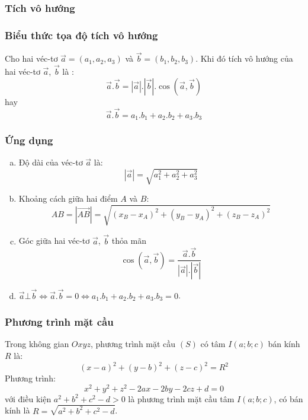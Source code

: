 \subsubsection{Tích vô hướng}
\subsubsection*{Biểu thức tọa độ tích vô hướng}
\begin{dl}
Cho hai véc-tơ $\vec{a}=(a_1,a_2,a_3)$ và $\vec{b}=(b_1,b_2,b_3)$. Khi đó tích vô hướng của hai véc-tơ $\vec{a}$, $\vec{b}$ là :
$$\boxed{\vec{a}.\vec{b}=\left| {\vec{a}}\right|.\left| {\vec{b}}\right|.\cos \left(\vec{a},\vec{b}\right)}$$ hay  $$\boxed{\vec{a}.\vec{b}=a_1.b_1+a_2.b_2+a_3.b_3}$$
\end{dl}
\subsubsection*{Ứng dụng}
\begin{enumerate}[a)]
\item Độ dài của véc-tơ $\vec{a}$ là:
$$\boxed{\left| {\vec{a}}\right|=\sqrt{a_1^2+a_2^2+a_3^2}}$$
\item Khoảng cách giữa hai điểm $A$ và $B$:
$$\boxed{AB=\left| \overrightarrow{AB}\right|=\sqrt{{\left(x_B-x_A\right)}^2+{\left(y_B-y_A\right)}^2+{\left(z_B-z_A\right)}^2}}$$
\item Góc giữa hai véc-tơ $\vec{a}$, $\vec{b}$ thỏa mãn
$$\boxed{\cos \left(\vec{a},\vec{b}\right)=\dfrac{\vec{a}.\vec{b}}{\left| {\vec{a}}\right|.\left| {\vec{b}}\right|}}$$
\item $\vec{a}\bot \vec{b}\Leftrightarrow \vec{a}.\vec{b}=0\Leftrightarrow a_1.b_1+a_2.b_2+a_3.b_3=0$.
\end{enumerate}
\subsubsection{Phương trình mặt cầu}
Trong không gian $Oxyz$, phương trình mặt cầu $(S)$ có tâm $I\left(a;b;c\right)$ bán kính $R$ là:
$$\boxed{(x-a)^2+(y-b)^2+(z-c)^2=R^2}$$ 
Phương trình:
$$\boxed{x^2+y^2+z^2-2ax-2by-2cz+d=0}$$ với điều kiện $a^2+b^2+c^2-d>0$ là phương trình mặt cầu tâm $I\left(a;b;c\right)$, có bán kính là $R=\sqrt{a^2+b^2+c^2-d}$.
